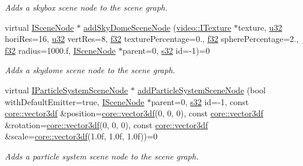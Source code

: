\begin{DoxyCompactItemize}
\begin{DoxyCompactList}\small\item\em Adds a skybox scene node to the scene graph. \end{DoxyCompactList}\item 
virtual \hyperlink{classirr_1_1scene_1_1ISceneNode}{I\+Scene\+Node} $\ast$ \hyperlink{classirr_1_1scene_1_1ISceneManager_aadf84a7a18a5ed92d9868f90c506daa7}{add\+Sky\+Dome\+Scene\+Node} (\hyperlink{classirr_1_1video_1_1ITexture}{video\+::\+I\+Texture} $\ast$texture, \hyperlink{namespaceirr_a0416a53257075833e7002efd0a18e804}{u32} hori\+Res=16, \hyperlink{namespaceirr_a0416a53257075833e7002efd0a18e804}{u32} vert\+Res=8, \hyperlink{namespaceirr_a0277be98d67dc26ff93b1a6a1d086b07}{f32} texture\+Percentage=0., \hyperlink{namespaceirr_a0277be98d67dc26ff93b1a6a1d086b07}{f32} sphere\+Percentage=2., \hyperlink{namespaceirr_a0277be98d67dc26ff93b1a6a1d086b07}{f32} radius=1000.f, \hyperlink{classirr_1_1scene_1_1ISceneNode}{I\+Scene\+Node} $\ast$parent=0, \hyperlink{namespaceirr_ac66849b7a6ed16e30ebede579f9b47c6}{s32} id=-\/1)=0
\begin{DoxyCompactList}\small\item\em Adds a skydome scene node to the scene graph. \end{DoxyCompactList}\item 
virtual \hyperlink{classirr_1_1scene_1_1IParticleSystemSceneNode}{I\+Particle\+System\+Scene\+Node} $\ast$ \hyperlink{classirr_1_1scene_1_1ISceneManager_a1c1c2b024a01bd1d6d56518926e37fa8}{add\+Particle\+System\+Scene\+Node} (bool with\+Default\+Emitter=true, \hyperlink{classirr_1_1scene_1_1ISceneNode}{I\+Scene\+Node} $\ast$parent=0, \hyperlink{namespaceirr_ac66849b7a6ed16e30ebede579f9b47c6}{s32} id=-\/1, const \hyperlink{namespaceirr_1_1core_ae6e2b2a6c552833ebbd5b7463d03586b}{core\+::vector3df} \&position=\hyperlink{namespaceirr_1_1core_ae6e2b2a6c552833ebbd5b7463d03586b}{core\+::vector3df}(0, 0, 0), const \hyperlink{namespaceirr_1_1core_ae6e2b2a6c552833ebbd5b7463d03586b}{core\+::vector3df} \&rotation=\hyperlink{namespaceirr_1_1core_ae6e2b2a6c552833ebbd5b7463d03586b}{core\+::vector3df}(0, 0, 0), const \hyperlink{namespaceirr_1_1core_ae6e2b2a6c552833ebbd5b7463d03586b}{core\+::vector3df} \&scale=\hyperlink{namespaceirr_1_1core_ae6e2b2a6c552833ebbd5b7463d03586b}{core\+::vector3df}(1.\+0f, 1.\+0f, 1.\+0f))=0
\begin{DoxyCompactList}\small\item\em Adds a particle system scene node to the scene graph. \end{DoxyCompactList}\item 

\end{DoxyCompactItemize}
